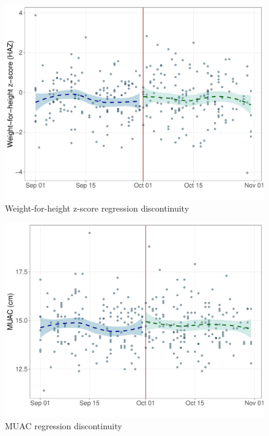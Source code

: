 \documentclass[12pt,a4paper]{article}
\begin{document}
\begin{figure}[H]

{\centering \includegraphics{kayahReport_files/figure-latex/rd4-1} 

}

\caption{Weight-for-height z-score regression discontinuity}\label{fig:rd4}
\end{figure}

\begin{figure}[H]

{\centering \includegraphics{kayahReport_files/figure-latex/rd5-1} 

}

\caption{MUAC regression discontinuity}\label{fig:rd5}
\end{figure}
\end{document}
